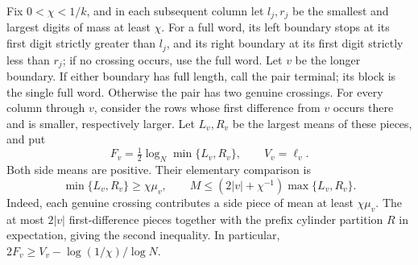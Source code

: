 Fix $0<\chi<1/k$, and in each subsequent column let $l_j,r_j$ be the
smallest and largest digits of mass at least $\chi$. For a full word,
its left boundary stops at its first digit strictly greater than $l_j$,
and its right boundary at its first digit strictly less than $r_j$;
if no crossing occurs, use the full word. Let $v$ be the longer
boundary. If either boundary has full length, call the pair terminal;
its block is the single full word. Otherwise the pair has two genuine
crossings. For every column through $v$, consider the rows whose first
difference from $v$ occurs there and is smaller, respectively larger.
Let $L_v,R_v$ be the largest means of these pieces, and put
\[
 F_v=\tfrac12\log_N\min\{L_v,R_v\},\qquad V_v=\ell_v.
\]
Both side means are positive. Their elementary comparison is
\begin{equation}\label{eq:upper-side-scale}
 \min\{L_v,R_v\}\ge\chi\mu_v,\qquad
 M\le(2|v|+\chi^{-1})\max\{L_v,R_v\}.
\end{equation}
Indeed, each genuine crossing contributes a side piece of mean at
least $\chi\mu_v$. The at most $2|v|$ first-difference pieces together
with the prefix cylinder partition $R$ in expectation, giving the
second inequality. In particular,
$2F_v\ge V_v-\log(1/\chi)/\log N$.

